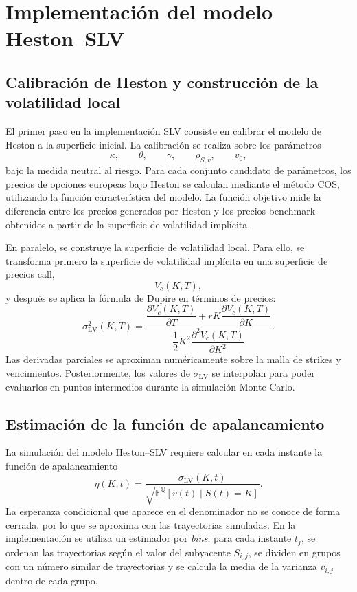 \section{Implementación del modelo Heston--SLV}

\subsection{Calibración de Heston y construcción de la volatilidad local}

El primer paso en la implementación SLV consiste en calibrar el modelo de Heston a la superficie inicial. La calibración se realiza sobre los parámetros
\[
\kappa,\qquad \theta,\qquad \gamma,\qquad \rho_{S,v},\qquad v_0,
\]
bajo la medida neutral al riesgo. Para cada conjunto candidato de parámetros, los precios de opciones europeas bajo Heston se calculan mediante el método COS, utilizando la función característica del modelo. La función objetivo mide la diferencia entre los precios generados por Heston y los precios benchmark obtenidos a partir de la superficie de volatilidad implícita.\medskip

En paralelo, se construye la superficie de volatilidad local. Para ello, se transforma primero la superficie de volatilidad implícita en una superficie de precios call,
\[
V_c(K,T),
\]
y después se aplica la fórmula de Dupire en términos de precios:
\[
\sigma_{\mathrm{LV}}^2(K,T)
=
\frac{
\dfrac{\partial V_c(K,T)}{\partial T}
+
rK\dfrac{\partial V_c(K,T)}{\partial K}
}{
\dfrac{1}{2}K^2
\dfrac{\partial^2 V_c(K,T)}{\partial K^2}
}.
\]
Las derivadas parciales se aproximan numéricamente sobre la malla de strikes y vencimientos. Posteriormente, los valores de \(\sigma_{\mathrm{LV}}\) se interpolan para poder evaluarlos en puntos intermedios durante la simulación Monte Carlo.

\subsection{Estimación de la función de apalancamiento}

La simulación del modelo Heston--SLV requiere calcular en cada instante la función de apalancamiento
\[
\eta(K,t)
=
\frac{\sigma_{\mathrm{LV}}(K,t)}
{\sqrt{\mathbb{E}^{\mathbb{Q}}[v(t)\mid S(t)=K]}}.
\]
La esperanza condicional que aparece en el denominador no se conoce de forma cerrada, por lo que se aproxima con las trayectorias simuladas. En la implementación se utiliza un estimador por \textit{bins}: para cada instante \(t_j\), se ordenan las trayectorias según el valor del subyacente \(S_{i,j}\), se dividen en grupos con un número similar de trayectorias y se calcula la media de la varianza \(v_{i,j}\) dentro de cada grupo.\medskip

